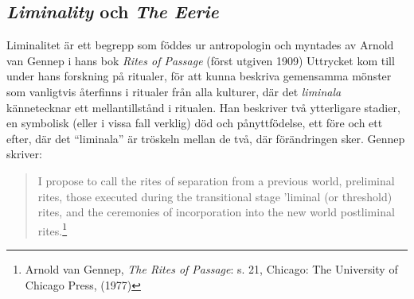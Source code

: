 \documentclass{article}
\begin{document}
\subsection{\emph{Liminality} och \emph{The Eerie}}
Liminalitet är ett begrepp som föddes ur antropologin och myntades av Arnold van Gennep i hans bok \emph{Rites
of Passage} (först utgiven 1909) Uttrycket kom till under hans forskning på ritualer, för att kunna beskriva
gemensamma mönster som vanligtvis återfinns i ritualer från alla kulturer, där det \emph{liminala}
kännetecknar ett mellantillstånd i ritualen. Han beskriver två ytterligare stadier, en symbolisk (eller i
vissa fall verklig) död och pånyttfödelse, ett före och ett efter, där det ``liminala'' är
tröskeln mellan de två, där förändringen sker.
Gennep skriver:

\begin{quote}
I propose to call the rites of separation from a previous world, preliminal rites, those executed during the
transitional stage 'liminal (or threshold) rites, and the ceremonies of incorporation into the new world
postliminal rites.\footnote{Arnold van Gennep, \emph{The Rites of Passage}: s. 21,  Chicago: The
University of Chicago Press, (1977)}
\end{quote}

\end{document}
